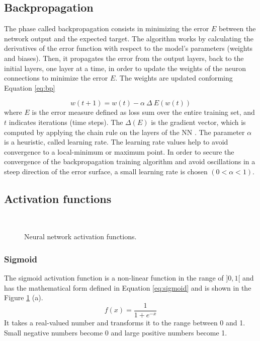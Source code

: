 \subsection{Backpropagation}
The phase called backpropagation consists in minimizing the error $E$ between the network output and the expected target. The algorithm works by calculating the derivatives of the error
function with respect to the model’s parameters (weights and biases). Then, it propagates the error from the output layers, back to the initial layers, one layer at a time, in order to update the weights of the neuron connections to minimize the error $E$. The weights are updated conforming Equation \ref{eq:bp}

\begin{equation}
w(t+1) = w(t) - \alpha\ \Delta\ E(w(t))
\label{eq:bp}
\end{equation}
where $E$ is the error measure defined as loss sum over the entire training set, and $t$ indicates iterations (time steps). The $\Delta(E)$ is the gradient vector, which is computed by applying the chain rule on the layers of the NN \cite{rumelhart1985learning}. The parameter $\alpha$ is a heuristic, called learning rate. The learning rate values help to avoid convergence to a local-minimum or maximum point. In order to secure the convergence of the backpropagation training algorithm and avoid oscillations in a steep direction of the error surface, a small learning rate is chosen $(0 < \alpha < 1)$.

\subsection{Activation functions}
\begin{figure}[!htb]
\centering
\hspace*{0.2in} %
\\
\hspace*{0.2in} %


\caption{Neural network activation functions. } \label{fig:activation}
\end{figure}
\subsubsection{Sigmoid}
The sigmoid activation function is a non-linear function in the range of $]0, 1[$ and has the mathematical form defined in Equation \ref{eq:sigmoid} and is shown in the Figure \ref{fig:activation} (a).
\begin{equation}
f(x) = \frac{1}{1+e^{-x}}
\label{eq:sigmoid}
\end{equation}
It takes a real-valued number and transforms it to the range between 0 and 1. Small negative numbers become 0 and large positive numbers become 1. 
